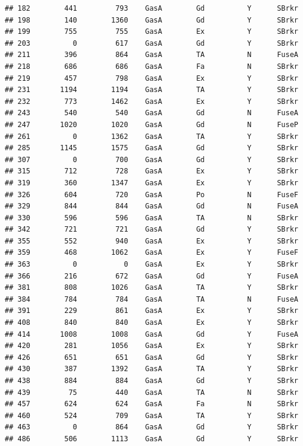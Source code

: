 \documentclass[]{article}
\begin{document}
\begin{verbatim}
## 182        441         793    GasA        Gd          Y      SBrkr
## 198        140        1360    GasA        Gd          Y      SBrkr
## 199        755         755    GasA        Ex          Y      SBrkr
## 203          0         617    GasA        Gd          Y      SBrkr
## 211        396         864    GasA        TA          N      FuseA
## 218        686         686    GasA        Fa          N      SBrkr
## 219        457         798    GasA        Ex          Y      SBrkr
## 231       1194        1194    GasA        TA          Y      SBrkr
## 232        773        1462    GasA        Ex          Y      SBrkr
## 243        540         540    GasA        Gd          N      FuseA
## 247       1020        1020    GasA        Gd          N      FuseP
## 261          0        1362    GasA        TA          Y      SBrkr
## 285       1145        1575    GasA        Gd          Y      SBrkr
## 307          0         700    GasA        Gd          Y      SBrkr
## 315        712         728    GasA        Ex          Y      SBrkr
## 319        360        1347    GasA        Ex          Y      SBrkr
## 326        604         720    GasA        Po          N      FuseF
## 329        844         844    GasA        Gd          N      FuseA
## 330        596         596    GasA        TA          N      SBrkr
## 342        721         721    GasA        Gd          Y      SBrkr
## 355        552         940    GasA        Ex          Y      SBrkr
## 359        468        1062    GasA        Ex          Y      FuseF
## 363          0           0    GasA        Ex          Y      SBrkr
## 366        216         672    GasA        Gd          Y      FuseA
## 381        808        1026    GasA        TA          Y      SBrkr
## 384        784         784    GasA        TA          N      FuseA
## 391        229         861    GasA        Ex          Y      SBrkr
## 408        840         840    GasA        Ex          Y      SBrkr
## 414       1008        1008    GasA        Gd          Y      FuseA
## 420        281        1056    GasA        Ex          Y      SBrkr
## 426        651         651    GasA        Gd          Y      SBrkr
## 430        387        1392    GasA        TA          Y      SBrkr
## 438        884         884    GasA        Gd          Y      SBrkr
## 439         75         440    GasA        TA          N      SBrkr
## 457        624         624    GasA        Fa          N      SBrkr
## 460        524         709    GasA        TA          Y      SBrkr
## 463          0         864    GasA        Gd          Y      SBrkr
## 486        506        1113    GasA        Gd          Y      SBrkr

\end{verbatim}
\end{document}
